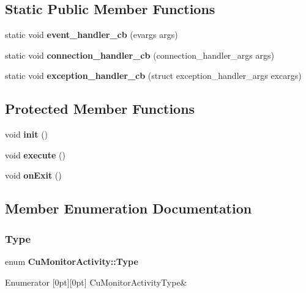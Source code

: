 \subsection*{Static Public Member Functions}
\begin{DoxyCompactItemize}
\item 
static void \textbf{ event\+\_\+handler\+\_\+cb} (evargs args)
\item 
static void \textbf{ connection\+\_\+handler\+\_\+cb} (connection\+\_\+handler\+\_\+args args)
\item 
static void \textbf{ exception\+\_\+handler\+\_\+cb} (struct exception\+\_\+handler\+\_\+args excargs)
\end{DoxyCompactItemize}
\subsection*{Protected Member Functions}
\begin{DoxyCompactItemize}
\item 
void \textbf{ init} ()
\item 
void \textbf{ execute} ()
\item 
void \textbf{ on\+Exit} ()
\end{DoxyCompactItemize}


\subsection{Member Enumeration Documentation}
\mbox{\label{classCuMonitorActivity_a9b300629c9bf253981975798e662c1b8}} 
\subsubsection{Type}
{\footnotesize\ttfamily enum \textbf{ Cu\+Monitor\+Activity\+::\+Type}}

\begin{DoxyEnumFields}{Enumerator}
[0pt][0pt]{}\mbox{\label{classCuMonitorActivity_a9b300629c9bf253981975798e662c1b8aba9592e133e9274c45ac7e2efcf9c81e}} 
Cu\+Monitor\+Activity\+Type&\\
\hline

\end{DoxyEnumFields}


